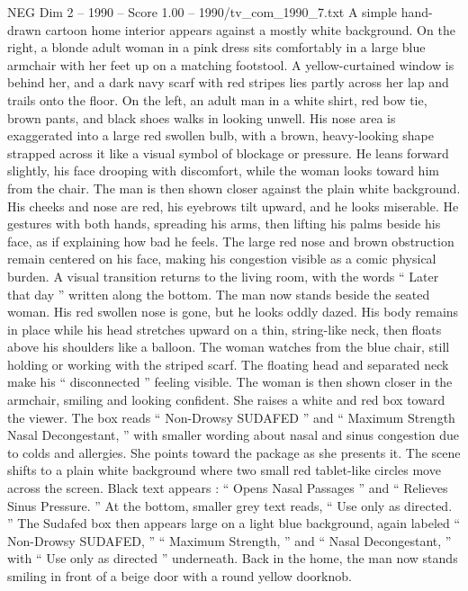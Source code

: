\begin{textsample}{NEG Dim 2 – 1990 – Score 1.00 – 1990/tv\_com\_1990\_7.txt}  \label{ex:f2_neg_062}
A simple hand-drawn cartoon home interior appears against a mostly white background.
On the right, a blonde adult woman in a pink dress sits comfortably in a large blue armchair with her feet up on a matching footstool.
A yellow-curtained window is behind her, and a dark navy scarf with red stripes lies partly across her lap and trails onto the floor.
On the left, an adult man in a white shirt, red bow tie, brown pants, and black shoes walks in looking unwell.
His nose area is exaggerated into a large red swollen bulb, with a brown, heavy-looking shape strapped across it like a visual symbol of blockage or pressure.
He leans forward slightly, his face drooping with discomfort, while the woman looks toward him from the chair.
The man is then shown closer against the plain white background.
His cheeks and nose are red, his eyebrows tilt upward, and he looks miserable.
He gestures with both hands, spreading his arms, then lifting his palms beside his face, as if explaining how bad he feels.
The large red nose and brown obstruction remain centered on his face, making his congestion visible as a comic physical burden.
A visual transition returns to the living room, with the words “ Later that day ” written along the bottom.
The man now stands beside the seated woman.
His red swollen nose is gone, but he looks oddly dazed.
His body remains in place while his head stretches upward on a thin, string-like neck, then floats above his shoulders like a balloon.
The woman watches from the blue chair, still holding or working with the striped scarf.
The floating head and separated neck make his “ disconnected ” feeling visible.
The woman is then shown closer in the armchair, smiling and looking confident.
She raises a white and red box toward the viewer.
The box reads “ Non-Drowsy SUDAFED ” and “ Maximum Strength Nasal Decongestant, ” with smaller wording about nasal and sinus congestion due to colds and allergies.
She points toward the package as she presents it.
The scene shifts to a plain white background where two small red tablet-like circles move across the screen.
Black text appears : “ Opens Nasal Passages ” and “ Relieves Sinus Pressure. ” At the bottom, smaller grey text reads, “ Use only as directed. ” The Sudafed box then appears large on a light blue background, again labeled “ Non-Drowsy SUDAFED, ” “ Maximum Strength, ” and “ Nasal Decongestant, ” with “ Use only as directed ” underneath.
Back in the home, the man now stands smiling in front of a beige door with a round yellow doorknob.

\end{textsample}
